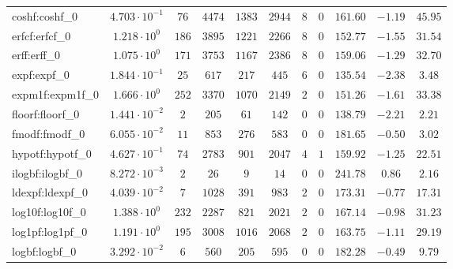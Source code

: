 \begin{tabular}{|l|c|c|c|c|c|c|c|c|c|c|}
coshf:coshf\_0               & $ 4.703 \cdot 10^{-1} $ & $ 76     $ & $ 4474  $ & $ 1383  $ & $ 2944  $ & $ 8   $ & $ 0 $ & $ 161.60      $ & $ -1.19   $ & $ 45.95   $ \\
erfcf:erfcf\_0               & $ 1.218 \cdot 10^{0}  $ & $ 186    $ & $ 3895  $ & $ 1221  $ & $ 2266  $ & $ 8   $ & $ 0 $ & $ 152.77      $ & $ -1.55   $ & $ 31.54   $ \\
erff:erff\_0                 & $ 1.075 \cdot 10^{0}  $ & $ 171    $ & $ 3753  $ & $ 1167  $ & $ 2386  $ & $ 8   $ & $ 0 $ & $ 159.06      $ & $ -1.29   $ & $ 32.70   $ \\
expf:expf\_0                 & $ 1.844 \cdot 10^{-1} $ & $ 25     $ & $ 617   $ & $ 217   $ & $ 445   $ & $ 6   $ & $ 0 $ & $ 135.54      $ & $ -2.38   $ & $ 3.48    $ \\
expm1f:expm1f\_0             & $ 1.666 \cdot 10^{0}  $ & $ 252    $ & $ 3370  $ & $ 1070  $ & $ 2149  $ & $ 2   $ & $ 0 $ & $ 151.26      $ & $ -1.61   $ & $ 33.38   $ \\
floorf:floorf\_0             & $ 1.441 \cdot 10^{-2} $ & $ 2      $ & $ 205   $ & $ 61    $ & $ 142   $ & $ 0   $ & $ 0 $ & $ 138.79      $ & $ -2.21   $ & $ 2.21    $ \\
fmodf:fmodf\_0               & $ 6.055 \cdot 10^{-2} $ & $ 11     $ & $ 853   $ & $ 276   $ & $ 583   $ & $ 0   $ & $ 0 $ & $ 181.65      $ & $ -0.50   $ & $ 3.02    $ \\
hypotf:hypotf\_0             & $ 4.627 \cdot 10^{-1} $ & $ 74     $ & $ 2783  $ & $ 901   $ & $ 2047  $ & $ 4   $ & $ 1 $ & $ 159.92      $ & $ -1.25   $ & $ 22.51   $ \\
ilogbf:ilogbf\_0             & $ 8.272 \cdot 10^{-3} $ & $ 2      $ & $ 26    $ & $ 9     $ & $ 14    $ & $ 0   $ & $ 0 $ & $ 241.78      $ & $ 0.86    $ & $ 2.16    $ \\
ldexpf:ldexpf\_0             & $ 4.039 \cdot 10^{-2} $ & $ 7      $ & $ 1028  $ & $ 391   $ & $ 983   $ & $ 2   $ & $ 0 $ & $ 173.31      $ & $ -0.77   $ & $ 17.31   $ \\
log10f:log10f\_0             & $ 1.388 \cdot 10^{0}  $ & $ 232    $ & $ 2287  $ & $ 821   $ & $ 2021  $ & $ 2   $ & $ 0 $ & $ 167.14      $ & $ -0.98   $ & $ 31.23   $ \\
log1pf:log1pf\_0             & $ 1.191 \cdot 10^{0}  $ & $ 195    $ & $ 3008  $ & $ 1016  $ & $ 2068  $ & $ 2   $ & $ 0 $ & $ 163.75      $ & $ -1.11   $ & $ 29.19   $ \\
logbf:logbf\_0               & $ 3.292 \cdot 10^{-2} $ & $ 6      $ & $ 560   $ & $ 205   $ & $ 595   $ & $ 0   $ & $ 0 $ & $ 182.28      $ & $ -0.49   $ & $ 9.79    $ \\

\end{tabular}
